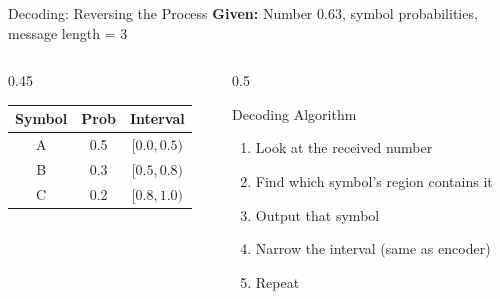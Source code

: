 \documentclass[aspectratio=169,12pt]{beamer}
\begin{document}
\begin{frame}{Decoding: Reversing the Process}
    \textbf{Given:} Number $0.63$, symbol probabilities, message length = 3
    
    \begin{columns}
        \begin{column}{0.45\textwidth}
            \begin{center}
                \begin{tabular}{c|c|c}
                    \toprule
                    Symbol & Prob & Interval \\
                    \midrule
                    A & 0.5 & $[0.0, 0.5)$ \\
                    B & 0.3 & $[0.5, 0.8)$ \\
                    C & 0.2 & $[0.8, 1.0)$ \\
                    \bottomrule
                \end{tabular}
            \end{center}
        \end{column}
        \begin{column}{0.5\textwidth}
            \begin{block}{Decoding Algorithm}
                \begin{enumerate}
                    \item Look at the received number
                    \item Find which symbol's region contains it
                    \item Output that symbol
                    \item Narrow the interval (same as encoder)
                    \item Repeat
                \end{enumerate}
            \end{block}
        \end{column}
    \end{columns}
\end{frame}
\end{document}
